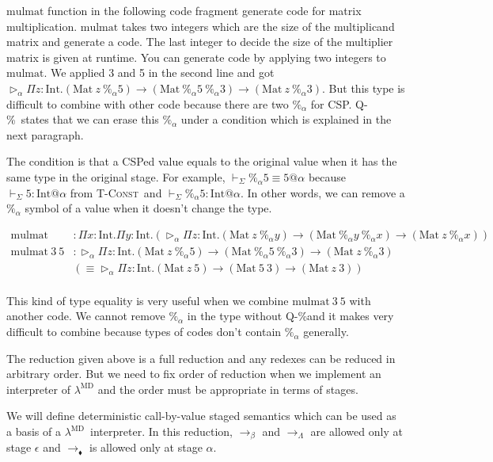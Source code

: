\documentclass[runningheads]{llncs}
\newcommand{\LMD}{$\lambda^{\textrm{MD}}$\xspace}
\newcommand{\V}{\vdash_\Sigma}
\newcommand{\TW}{\triangleright}
\newcommand{\E}{\equiv}
\newcommand{\TConst}{\textsc{T-Const}}
\newcommand{\QPercent}{\textsc{Q-\%}}
\newcommand{\I}{\textrm{Int}}
\newcommand{\M}{\textrm{Mat}}
\begin{document}
$\text{mulmat}$ function in the following code fragment generate code for matrix multiplication.
$\text{mulmat}$ takes two integers which are the size of the multiplicand matrix and generate a code.
The last integer to decide the size of the multiplier matrix is given at runtime.
You can generate code by applying two integers to $\text{mulmat}$.
We applied 3 and 5 in the second line and got $\TW_\alpha \Pi z:\I.(\M\ z\ \%_\alpha 5) \to (\M\ \%_\alpha 5\ \%_\alpha 3) \to (\M\ z\ \%_\alpha 3)$.
But this type is difficult to combine with other code because there are two $\%_\alpha$ for CSP.
\QPercent\ states that we can erase this $\%_\alpha$ under a condition which is explained in the next paragraph.

The condition is that a CSPed value equals to the original value when it has the same type in the original stage.
For example, $\V \%_\alpha 5 \E 5 @ \alpha$ because $ \V 5 : \I @ \alpha $ from \TConst\ and  $ \V \%_\alpha 5 : \I @ \alpha$.
In other words, we can remove a $\%_\alpha$ symbol of a value when it doesn't change the type.

	{
		\begin{align*}
			\text{mulmat}       & : \Pi x:\I.\Pi y:\I.(\TW_\alpha \Pi z:\I.(\M\ z\ \%_\alpha y) \to (\M\ \%_\alpha y\ \%_\alpha x) \to (\M\ z\ \%_\alpha x)) \\
			\text{mulmat}\ 3\ 5 & : \TW_\alpha \Pi z:\I.(\M\ z\ \%_\alpha 5) \to (\M\ \%_\alpha 5\ \%_\alpha 3) \to (\M\ z\ \%_\alpha 3)                     \\
			                    & (\E \TW_\alpha \Pi z:\I.(\M\ z\ 5) \to (\M\ 5\ 3) \to (\M\ z\ 3) )                                                         \\
		\end{align*}
	}

This kind of type equality is very useful when we combine $\text{mulmat}\ 3\ 5$ with another code.
We cannot remove $\%_\alpha$ in the type without \QPercent and it makes very difficult to combine
because types of codes don't contain $\%_\alpha$ generally.

The reduction given above is a full reduction and any redexes can be reduced in arbitrary order.
But we need to fix order of reduction when we implement an interpreter of \LMD and
the order must be appropriate in terms of stages.

We will define deterministic call-by-value staged semantics which can be used as a basis of a \LMD\ interpreter.
In this reduction, $\longrightarrow_\beta$ and $\longrightarrow_\Lambda$ are allowed only at stage $\epsilon$ and 
$\longrightarrow_\blacklozenge$ is allowed only at stage $\alpha$.
\end{document}
